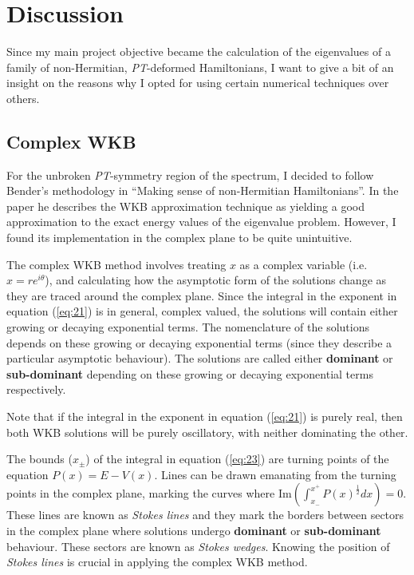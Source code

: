 \documentclass[10pt, a4paper, singlespacing]{report}
\newcommand\PT{\emph{PT}}
\begin{document}

\chapter{Discussion}\label{Discussion}
Since my main project objective became the calculation of the eigenvalues of a family of non-Hermitian, \PT-deformed Hamiltonians, I want to give a bit of an insight on the reasons why I opted for using certain numerical techniques over others.

\section{Complex WKB}\label{Complex WKB}
For the unbroken \PT-symmetry region of the spectrum, I decided to follow Bender's methodology in ``Making sense of non-Hermitian Hamiltonians''. In the paper he describes the WKB approximation technique as yielding a good approximation to the exact energy values of the eigenvalue problem. However, I found its implementation in the complex plane to be quite unintuitive.

The complex WKB method involves treating $x$ as a complex variable (i.e. $x = re^{i\theta}$), and calculating how the asymptotic form of the solutions change as they are traced around the complex plane\cite{Sorrell}. 
Since the integral in the exponent in equation (\ref{eq:21}) is in general, complex valued, the solutions will contain either growing or decaying exponential terms. The nomenclature of the solutions depends on these growing or decaying exponential terms (since they describe a particular asymptotic behaviour). The solutions are called either \textbf{dominant} or \textbf{sub-dominant} depending on these growing or decaying exponential terms respectively.

Note that if the integral in the exponent in equation (\ref{eq:21}) is purely real, then both WKB solutions will be purely oscillatory, with neither dominating the other\cite{Sorrell}.

The bounds ($x_{\pm}$) of the integral in equation (\ref{eq:23}) are turning points of the equation $P(x) = E - V(x)$. Lines can be drawn emanating from the turning points in the complex plane, marking the curves where $\mathrm{Im}(\int_{x_-}^{x^+} P(x)^{\frac{1}{2}}dx) = 0$. These lines are known as \emph{Stokes lines} and they mark the borders between sectors in the complex plane where solutions undergo \textbf{dominant} or \textbf{sub-dominant} behaviour. These sectors are known as \emph{Stokes wedges}. Knowing the position of \emph{Stokes lines} is crucial in applying the complex WKB method\cite{Sorrell}.
\end{document}
